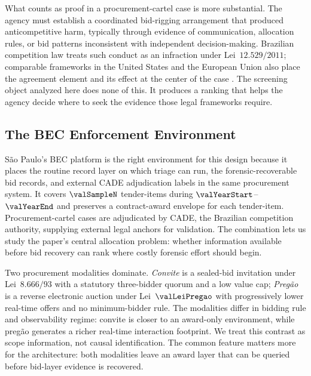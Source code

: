 What counts as proof in a procurement-cartel case is more
substantial. The agency must establish a coordinated
bid-rigging arrangement that produced anticompetitive harm,
typically through evidence of communication, allocation rules,
or bid patterns inconsistent with independent decision-making.
Brazilian competition law treats such conduct as an infraction
under Lei~$12.529/2011$; comparable frameworks in the United
States and the European Union also place the agreement element
and its effect at the center of the case
\citep{hovenkamp2005federal}. The screening object analyzed here
does none of this. It produces a ranking that helps the agency
decide where to seek the evidence those legal frameworks
require.

\subsection{The BEC Enforcement Environment}
\label{sec:setting_bec}

São Paulo's BEC platform is the right environment for this
design because it places the routine record layer on which
triage can run, the forensic-recoverable bid records, and
external CADE adjudication labels in the same procurement
system. It covers $\valSampleN$ tender-items during
$\valYearStart$--$\valYearEnd$ and preserves a contract-award
envelope for each tender-item. Procurement-cartel cases are
adjudicated by CADE, the Brazilian competition authority,
supplying external legal anchors for validation. The
combination lets us study the paper's central allocation
problem: whether information available before bid recovery can
rank where costly forensic effort should begin.

Two procurement modalities dominate. \emph{Convite} is a
sealed-bid invitation under Lei~$8.666/93$ with a statutory
three-bidder quorum and a low value cap; \emph{Pregão} is a
reverse electronic auction under Lei~$\valLeiPregao$ with
progressively lower real-time offers and no minimum-bidder rule.
The modalities differ in bidding rule and observability regime:
convite is closer to an award-only environment, while pregão
generates a richer real-time interaction footprint. We treat
this contrast as scope information, not causal identification.
The common feature matters more for the architecture: both
modalities leave an award layer that can be queried before
bid-layer evidence is recovered.

